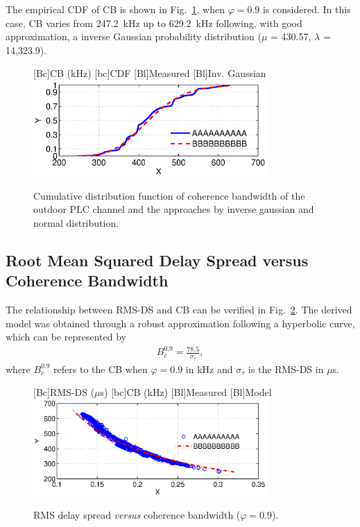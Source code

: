 \documentclass[journal]{IEEEtran}
\newcommand{\tamfig}{3.5in}    %
\begin{document}
The empirical CDF of CB is shown in Fig.~\ref{Fig:BC_CDF}, when  $\varphi = 0.9$ is considered. In this case, CB varies from 247.2~kHz up to 629.2~kHz following, with good approximation, a inverse Gaussian probability distribution ($\mu$ = 430.57, $\lambda$ = 14,323.9).  
\begin{figure}[!htp]
\begin{centering}
    [Bc]{CB (kHz)}    
    [bc]{CDF}
    [Bl]{Measured}
    [Bl]{Inv. Gaussian}
    \includegraphics[width=\tamfig]{Figuras/BC_CDF.eps}
    \caption{Cumulative distribution function of coherence bandwidth of the outdoor PLC channel and the approaches by inverse gaussian and normal distribution.}
    \label{Fig:BC_CDF}
\end{centering}
\end{figure}
  
\subsection{Root Mean Squared Delay Spread versus Coherence Bandwidth}

The relationship between RMS-DS and CB can be verified in Fig.~\ref{Fig:RMSDSxBC}. The derived model was obtained through a robust approximation following a hyperbolic curve, which can be represented by
\begin{eqnarray} \label{eq-RMSDSxBC}
B_c^{0.9} = \frac{78.5}{\sigma_{\tau}},    
\end{eqnarray}
where $B_c^{0.9}$ refers to the CB when $\varphi=0.9$ in kHz and $\sigma_{\tau}$ is the RMS-DS in $\mu$s.

\begin{figure}[!htp]
\begin{centering}
    [Bc]{RMS-DS ($\mu$s)}    
    [bc]{CB (kHz)}
    [Bl]{Measured}
    [Bl]{Model}
    \includegraphics[width=\tamfig]{Figuras/RMSDSxBC.eps}
    \caption{RMS delay spread \emph{versus} coherence bandwidth ($\varphi = 0.9$).}
    \label{Fig:RMSDSxBC}
\end{centering}
\end{figure}
\end{document}
